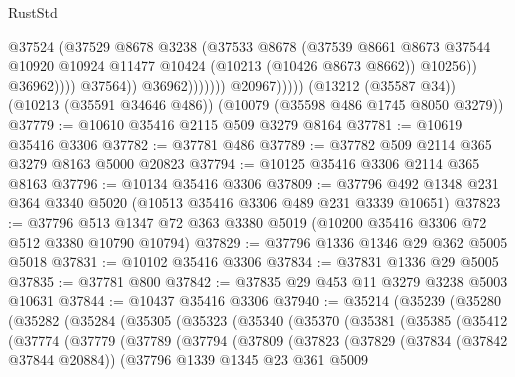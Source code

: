 \begin{lexlean}{RustStd}
\begin{coremodule}
                                      @37524
                                      (@37529
                                        @8678
                                        @3238
                                        (@37533
                                          @8678
                                          (@37539
                                            @8661
                                            @8673
                                            @37544
                                            @10920
                                            @10924
                                            @11477
                                            @10424
                                            (@10213 (@10426 @8673 @8662))
                                            @10256))
                                        @36962))))
                                @37564))
                            @36962)))))))
              @20967)))))
    (@13212 (@35587 @34))
    (@10213 (@35591 @34646 @486))
    (@10079 (@35598 @486 @1745 @8050 @3279))
@37779 := @10610 @35416 @2115 @509 @3279 @8164
@37781 := @10619 @35416 @3306
@37782 := @37781 @486
@37789 := @37782 @509 @2114 @365 @3279 @8163 @5000 @20823
@37794 := @10125 @35416 @3306 @2114 @365 @8163
@37796 := @10134 @35416 @3306
@37809 := @37796 @492 @1348 @231 @364 @3340 @5020 (@10513 @35416 @3306 @489 @231 @3339 @10651)
@37823 := @37796 @513 @1347 @72 @363 @3380 @5019 (@10200 @35416 @3306 @72 @512 @3380 @10790 @10794)
@37829 := @37796 @1336 @1346 @29 @362 @5005 @5018
@37831 := @10102 @35416 @3306
@37834 := @37831 @1336 @29 @5005
@37835 := @37781 @800
@37842 := @37835 @29 @453 @11 @3279 @3238 @5003 @10631
@37844 := @10437 @35416 @3306
@37940 := @35214
    (@35239
      (@35280
        (@35282
          (@35284
            (@35305
              (@35323
                (@35340
                  (@35370
                    (@35381
                      (@35385
                        (@35412
                          (@37774
                            (@37779
                              (@37789
                                (@37794
                                  (@37809
                                    (@37823
                                      (@37829
                                        (@37834 (@37842 @37844 @20884))
                                        (@37796
                                          @1339
                                          @1345
                                          @23
                                          @361
                                          @5009

\end{coremodule}
\end{lexlean}
